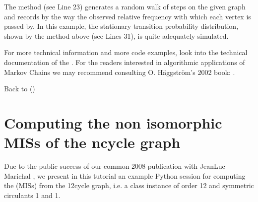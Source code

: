 \documentclass[a4paper,10pt,english]{sphinxhowto}
\begin{document}
\begin{sphinxVerbatim}[commandchars=\\\{\},numbers=left,firstnumber=1,stepnumber=1]
\end{sphinxVerbatim}

The  method (see Line 23) generates a random walk of  steps on the given graph and records by the way the observed relative frequency with which each vertex is passed by. In this example, the stationary transition probability distribution, shown by the  method above (see Lines 31\sphinxhyphen{}), is quite adequately simulated.

For more technical information and more code examples, look into the technical documentation of the . For the readers interested in algorithmic applications of Markov Chains we may recommend consulting O. Häggström’s 2002 book: .

Back to {\hyperref[\detokenize{tutorial:tutorial-label}]{}} ()


\section{Computing the non isomorphic MISs of the n\sphinxhyphen{}cycle graph}
\label{\detokenize{tutorial:computing-the-non-isomorphic-miss-of-the-n-cycle-graph}}\label{\detokenize{tutorial:isomorphicmis-tutorial-label}}
Due to the public success of our common 2008 publication with Jean\sphinxhyphen{}Luc Marichal  , we present in this tutorial an example Python session for computing the  (MISs) from the 12\sphinxhyphen{}cycle graph, i.e. a  class instance of order 12 and symmetric circulants 1 and \sphinxhyphen{}1.
\end{document}
